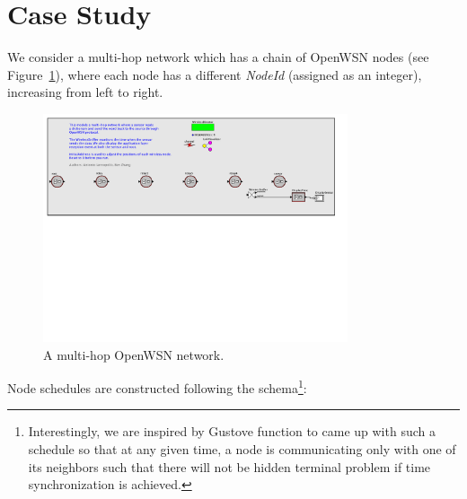 \section{Case Study}
\label{sec:case-study}

We consider a multi-hop network which has a chain of OpenWSN nodes (see Figure~\ref{fig:multihop}), where each node has a different {\em NodeId} (assigned as an integer), increasing from left to right. 
\begin{figure}[t]
\centering
\includegraphics[width=0.8\textwidth]{figures/PaperDemoPtolemy}
\caption{A multi-hop OpenWSN network.}
\label{fig:multihop}
\end{figure}
Node schedules are constructed following the schema\footnote{Interestingly, we are inspired by Gustove function to came up with such a schedule so that at any given time, a node is communicating only with one of its neighbors such that there will not be hidden terminal problem if time synchronization is achieved.}:

